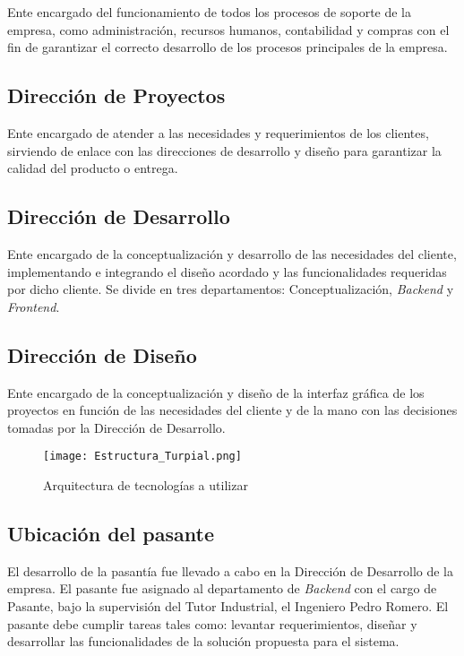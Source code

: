 Ente encargado del funcionamiento de todos los procesos de soporte de la empresa, como administración, recursos humanos, contabilidad y compras con el fin de garantizar el correcto desarrollo de los procesos principales de la empresa.

\subsection*{Dirección de Proyectos}

Ente encargado de atender a las necesidades y requerimientos de los clientes, sirviendo de enlace con las direcciones de desarrollo y diseño para garantizar la calidad del producto o entrega.

\subsection*{Dirección de Desarrollo}

Ente encargado de la conceptualización y desarrollo de las necesidades del cliente, implementando e integrando el diseño acordado y las funcionalidades requeridas por dicho cliente. Se divide en tres departamentos: Conceptualización, \textit{Backend} y \textit{Frontend}.

\subsection*{Dirección de Diseño}

Ente encargado de la conceptualización y diseño de la interfaz gráfica de los proyectos en función de las necesidades del cliente y de la mano con las decisiones tomadas por la Dirección de Desarrollo.

\begin{figure}
\centering
\texttt{[image: Estructura\_Turpial.png]}
\caption{Arquitectura de tecnologías a utilizar}
\label{fig:figura1.1}
\end{figure}

\subsection*{Ubicación del pasante}

El desarrollo de la pasantía fue llevado a cabo en la Dirección de Desarrollo de la empresa. El pasante fue asignado al departamento de \textit{Backend} con el cargo de Pasante, bajo la supervisión del Tutor Industrial, el Ingeniero Pedro Romero. El pasante debe cumplir tareas tales como: levantar requerimientos, diseñar y desarrollar las funcionalidades de la solución propuesta para el sistema.
